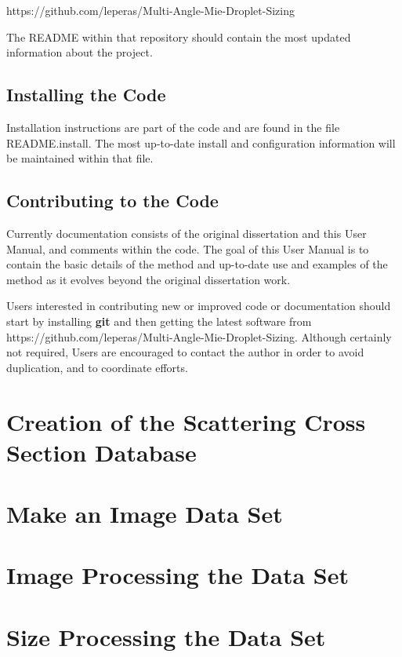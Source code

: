 https://github.com/leperas/Multi-Angle-Mie-Droplet-Sizing

The README within that repository should contain the most updated information about the project.

\subsection{Installing the Code}
Installation instructions are part of the code and are found in the file README.install.  The most up-to-date install and configuration information will be maintained within that file.

\subsection{Contributing to the Code}
Currently documentation consists of the original dissertation and this User Manual, and comments within the code. The goal of this User Manual is to contain the basic details of the method and up-to-date use and examples of the method as it evolves beyond the original dissertation work.

Users interested in contributing new or improved code or documentation should start by installing \textbf{git} and then getting the latest software from https://github.com/leperas/Multi-Angle-Mie-Droplet-Sizing.  Although certainly not required, Users are encouraged to contact the author in order to avoid duplication, and to coordinate efforts.  

\section{Creation of the Scattering Cross Section Database}



\section{Make an Image Data Set}



\section{Image Processing the Data Set}

%

\section{Size Processing the Data Set}

%
